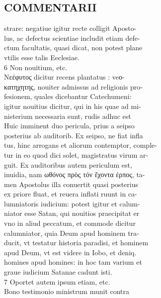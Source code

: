 \documentclass{article}
\begin{document}
\begin{pages}
\section*{COMMENTARII \\
                }strare: negatiue igitur recte colligit Aposto- \\
                lus, ac defectus scientiae includit etiam defe- \\
                ctum facultatis, quasi dicat, non potest plane \\
                vtilis esse talis Eeclesiae. \\
                6 Non nouitium, etc. \\
                Νεέφυτος dicitur recens plantatus : veο- \\
                κατηχητης, nouiter admissus ad religionis pro- \\
                fesionem, quales dicebantur Catechumeni: \\
                igitur nouitius dicitur, qui in his quae ad mi- \\
                nisterium necessaria sunt, rudis adhuc est \\
                Huic imminent duo pericula, prius a seipso \\
                posterius ab auditorib. Ex seipso, ne fiat infla \\
                tus, hinc arrogans et aliorum contemptor, comple- \\
                tur in eo quod dici solet, magistratus virum ar- \\
                guit. Ex auditoribus autem periculum est, \\
                inuidia, nam ωθόνος πρὸς τόν ἔχοντα έρπος, ta- \\
                men Apostolus illa conuertit quasi posterius \\
                ex priore fluat, et reuera inflati ruunt in ca- \\
                lumniatoris iudicium: potest igitur et calum- \\
                niator esse Satan, qui nouitios praecipitat er \\
                vno in aliud peccatum, et commode dicitur \\
                calumniator, quia Deum apud hominem tra- \\
                ducit, vt testatur historia paradisi, et hominem \\
                apud Deum, vt est videre in Iobo, et deniq. \\
                homines apud homines: in hoc tam varium et \\
                graue iudicium Satanae cadunt isti. \\
                7 Oportet autem ipsum etiam, etc. \\
                Bono testimonio ministrum munit contra \\
                

\end{pages}
\end{document}
